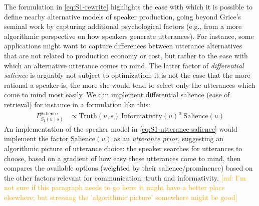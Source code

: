 \documentclass{sp}
\newcommand{\mf}[1]{\textcolor{orange}{[mf: #1]}}
\begin{document}
The formulation in \eqref{eq:S1-rewrite} highlights the ease with which it is possible to define nearby
alternative models of speaker production, going beyond Grice's seminal work by
capturing additional psychological factors (e.g., from a more algorithmic perspective on how speakers
generate utterances). For instance, some applications might want to capture differences between
utterance alternatives that are not related to production economy or cost, but rather to the
ease with which an alternative utterance comes to mind. The latter factor of \emph{differential
  salience} is arguably not subject to optimization: it is not the case that the more rational
a speaker is, the more she would tend to select only the utterances which come to mind most
easily. We can implement differential salience (ease of retrieval) for instance in a
formulation like this:
%
\begin{align}
  \label{eq:S1-utterance-salience}
  P_{S_1(u\mid s)}^{\text{Salience}}   & \propto \text{Truth}(u,s) \ \text{Informativity}(u)^{\alpha} \ \text{Salience}(u)
\end{align}
An implementation of the speaker model in \eqref{eq:S1-utterance-salience} would implement the
factor $\text{Salience}(u)$ as an \emph{utterance prior}, suggesting an algorithmic
picture of utterance choice: the speaker searches for utterances to choose, based on a gradient
of how easy these utterances come to mind, then compares the available options (weighted by
their salience/prominence) based on the other factors relevant for communication: truth and
informativity. \mf{I'm not sure if this paragraph needs to go here; it might have a better
  place elsewhere; but stressing the 'algorithmic picture' somewhere might be good}
\end{document}
